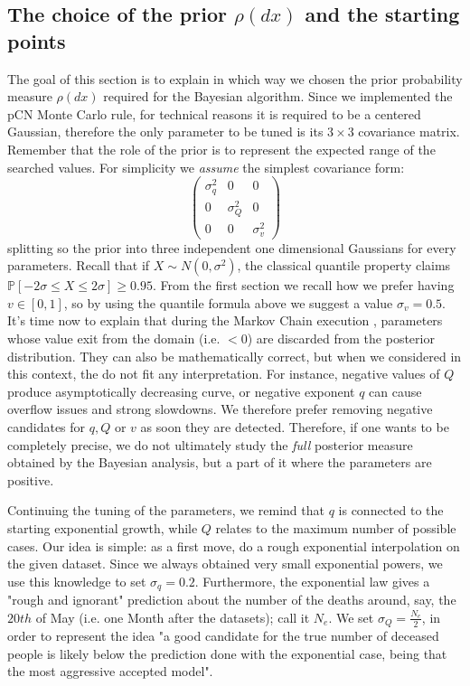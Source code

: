 \documentclass[8pt]{article}
\begin{document}
\subsection{The choice of the prior $\rho(dx)$ and the starting points}
The goal of this section is to explain in which way we chosen the
prior probability measure $\rho(dx)$ required for the Bayesian algorithm.
Since we implemented the pCN Monte Carlo rule, for technical reasons
it is required to be a centered Gaussian, therefore the only parameter
to be tuned is its $3 \times 3$ covariance matrix. Remember that the role of
the prior is to represent the expected range of the searched values.
For simplicity we \emph{assume} the simplest covariance form:
\begin{equation}
\begin{pmatrix}
	\sigma_q^2 & 0 & 0 \\
	0 & \sigma_Q^2 & 0 \\
	0 & 0 & \sigma_v^2
\end{pmatrix}
\end{equation}
splitting so the prior into three independent one dimensional Gaussians for
every parameters. Recall that if $X \sim N(0,\sigma^2)$, the classical
quantile property claims 
$\mathbb{P}[-2 \sigma \leq X \leq 2 \sigma] \geq 0.95$.
From the first section we recall how we prefer having $v \in [0,1]$, so by
using the quantile formula above we suggest a value $\sigma_v = 0.5$.
It's time now to explain that during the Markov Chain execution
, parameters whose value
exit from the domain (i.e. $<0$) are discarded from the posterior distribution.
They can also be mathematically correct, 
but when we considered in this context, the do not fit any
interpretation.
For instance, negative values of $Q$ produce asymptotically decreasing curve,
or negative exponent $q$ can cause overflow issues and strong slowdowns.
We therefore prefer removing negative candidates for $q, Q$ or $v$
as soon they are detected.
Therefore, if one wants to be completely precise,
we do not ultimately study the \emph{full} posterior measure 
obtained by the Bayesian
analysis, but a part of it where the parameters are positive.


Continuing the tuning of the parameters,
we remind that  $q$ is connected to the starting exponential growth, while $Q$ 
relates to the maximum number of possible cases. 
Our idea is simple: as a first move,
do a rough exponential interpolation on the given dataset. 
Since we always obtained very small exponential powers,
we use this knowledge to set  $\sigma_q = 0.2$.
Furthermore, the exponential law gives a "rough and ignorant"
prediction about the number of the deaths around, say, the $20th$ of May
(i.e. one Month after the datasets); call it $N_e$.
We set $\sigma_Q = \frac{N_e}{2}$, in order to represent the idea
"a good candidate for the true number of deceased people is likely
below the prediction done with the exponential case, being that the
most aggressive accepted model".
\end{document}
